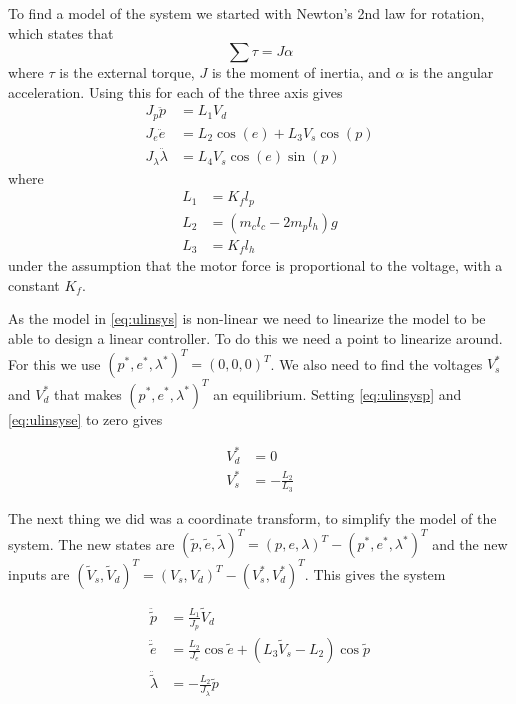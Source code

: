 To find a model of the system we started with Newton's 2nd law for rotation, which states that
\begin{equation} \label{eq:N2rot}
\sum \tau = J \alpha
\end{equation}
where $\tau$ is the external torque, $J$ is the moment of inertia, and $\alpha$ is the angular acceleration. Using this for each of the three axis gives
\begin{subequations}
  \begin{align}
    J_p\ddot{p} &= L_{1}V_{d} \label{eq:ulinsysp}\\
    J_e\ddot{e} &= L_{2} \cos(e) + L_3 V_s \cos(p) \label{eq:ulinsyse}\\
    J_\lambda \ddot{\lambda} &= L_4 V_s \cos(e) \sin(p) \label{eq:ulinsysl}
  \end{align}
  \label{eq:ulinsys}
\end{subequations}
where 
\begin{subequations}
	\begin{align*}
		L_1 &= K_f l_p\\
		L_2 &= (m_c l_c - 2 m_p l_h)g\\
		L_3 &= K_f l_h
	\end{align*}
\end{subequations}
under the assumption that the motor force is proportional to the voltage, with a constant $K_f$.

As the model in \cref{eq:ulinsys} is non-linear we need to linearize the model to be able to design a linear controller. To do this we need a point to linearize around. For this we use $(p^*, e^*, \lambda^*)^T = (0, 0, 0)^T$. We also need to find the voltages $V_s^*$ and $V_d^*$ that makes $(p^*, e^*, \lambda^*)^T$ an equilibrium. Setting \cref{eq:ulinsysp} and \cref{eq:ulinsyse} to zero gives

\begin{subequations}
	\begin{align*}
		V_d^* &= 0\\
		V_s^* &= -\frac{L_2}{L_3}
	\end{align*}
\end{subequations}

The next thing we did was a coordinate transform, to simplify the model of the system. The new states are $ (\tilde p, \tilde e, \tilde \lambda)^T = (p, e, \lambda)^T - (p^*, e^*, \lambda^*)^T $ and the new inputs are $(\tilde V_s, \tilde V_d)^T = (V_s, V_d)^T - (V_s^*, V_d^*)^T $. This gives the system

\begin{subequations}
	\begin{align}
		\ddot{\tilde p} &= \frac{L_1}{J_p} \tilde V_d\\
		\ddot{\tilde e} &= \frac{L_2}{J_e} \cos \tilde e + (L_3 \tilde V_s - L_2) \cos \tilde p\\
		\ddot{\tilde \lambda} &= -\frac{L_2}{J_{\lambda}} \tilde p
	\end{align}
	\label{eq:transformertulinsys}
\end{subequations}


